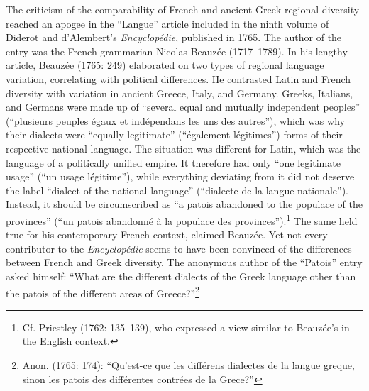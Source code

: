 \documentclass[12pt]{article}
\newenvironment{styleStandard}{\renewcommand\baselinestretch{1.25}\setlength\leftskip{0in}\setlength\rightskip{0in}\setlength\parindent{0.1972in}\setlength\parfillskip{0pt plus 1fil}\setlength\parskip{0in plus 1pt}\writerlistparindent\writerlistleftskip\leavevmode\normalfont\normalsize\writerlistlabel\ignorespaces}{\unskip\vspace{0in plus 1pt}\par}
\newcommand\writerlistleftskip{}
\newcommand\writerlistparindent{}
\newcommand\writerlistlabel{}
\begin{document}
\begin{styleStandard}
The criticism of the comparability of French and ancient Greek regional diversity reached an apogee in the “Langue” article included in the ninth volume of Diderot and d’Alembert’s \textit{Encyclopédie}, published in 1765. The author of the entry was the French grammarian Nicolas Beauzée (1717–1789). In his lengthy article, Beauzée (1765: 249) elaborated on two types of regional language variation, correlating with political differences. He contrasted Latin and French diversity with variation in ancient Greece, Italy, and Germany. Greeks, Italians, and Germans were made up of “several equal and mutually independent peoples” (“plusieurs peuples égaux et indépendans les uns des autres”), which was why their dialects were “equally legitimate” (“également légitimes”) forms of their respective national language. The situation was different for Latin, which was the language of a politically unified empire. It therefore had only “one legitimate usage” (“un usage légitime”), while everything deviating from it did not deserve the label “dialect of the national language” (“dialecte de la langue nationale”). Instead, it should be circumscribed as “a patois abandoned to the populace of the provinces” (“un patois abandonné à la populace des provinces”).\footnote{ Cf. Priestley (1762: 135–139), who expressed a view similar to Beauzée’s in the English context.} The same held true for his contemporary French context, claimed Beauzée. Yet not every contributor to the \textit{Encyclopédie} seems to have been convinced of the differences between French and Greek diversity. The anonymous author of the “Patois” entry asked himself: “What are the different dialects of the Greek language other than the patois of the different areas of Greece?”\footnote{ Anon. (1765: 174): “Qu’est-ce que les différens dialectes de la langue greque, sinon les patois des différentes contrées de la Grece?”}
\end{styleStandard}
\end{document}
